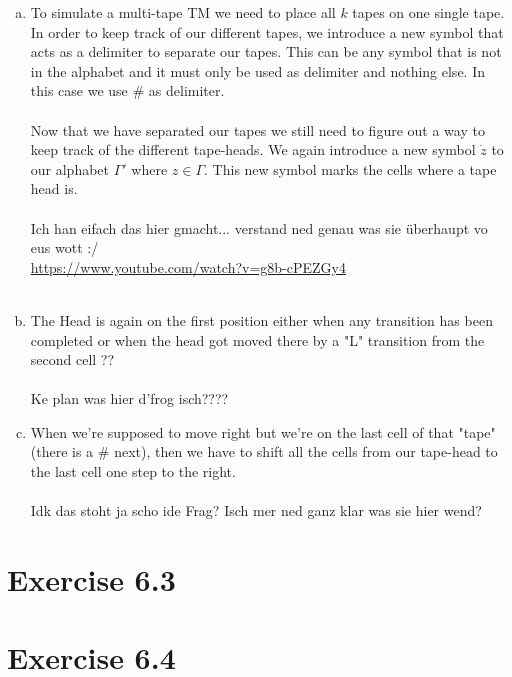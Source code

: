 \documentclass{article} %
\newcommand{\homeworkNumber}{6}
\begin{document}
\begin{enumerate}[(a)]
\item
To simulate a multi-tape TM we need to place all $k$ tapes on one single tape. In order to keep track of our different tapes, we introduce a new symbol that acts as a delimiter to separate our tapes. This can be any symbol that is not in the alphabet and it must only be used as delimiter and nothing else. In this case we use $\#$ as delimiter.\\\\
Now that we have separated our tapes we still need to figure out a way to keep track of the different tape-heads. We again introduce a new symbol $\dot{z}$ to our alphabet $\Gamma'$ where $z \in \Gamma$. This new symbol marks the cells where a tape head is. \\\\
Ich han eifach das hier gmacht... verstand ned genau was sie überhaupt vo eus wott :/ \\
\href{https://www.youtube.com/watch?v=g8b-cPEZGy4}{https://www.youtube.com/watch?v=g8b-cPEZGy4}\\\\



\item
The Head is again on the first position either when any transition has been completed or when the head got moved there by a "L" transition from the second cell ?? \\\\
Ke plan was hier d'frog isch????

\item
When we're supposed to move right but we're on the last cell of that "tape" (there is a $\#$ next), then we have to shift all the cells from our tape-head to the last cell one step to the right.\\\\
Idk das stoht ja scho ide Frag? Isch mer ned ganz klar was sie hier wend?


\end{enumerate}

\clearpage

\section*{Exercise \homeworkNumber.3}


\section*{Exercise \homeworkNumber.4}
\end{document}
